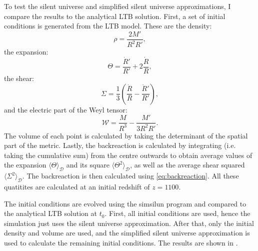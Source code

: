 To test the silent universe and simplified silent universe approximations, I compare the results to the analytical LTB solution.
First, a set of initial conditions is generated from the LTB model. These are the density:
\begin{equation}
    \rho = \frac{2M'}{R^2 R'},
\end{equation}
the expansion:
\begin{equation}
    \Theta = \frac{\dot{R}'}{R'} + 2\frac{\dot{R}}{R},
\end{equation}
the shear:
\begin{equation}
    \Sigma = \frac{1}{3}\left(\frac{\dot{R}}{R} - \frac{\dot{R}'}{R'}\right),
\end{equation}
and the electric part of the Weyl tensor:
\begin{equation}
    \mathcal{W} = \frac{M}{R^3}-\frac{M'}{3R^2R'}.
\end{equation}
The volume of each point is calculated by taking the determinant of the spatial part of the metric. Lastly, the backreaction is calculated by integrating (i.e. taking the cumulative sum) from the centre outwards to obtain average values of the expansion $\langle \Theta \rangle_\mathcal{D}$ and its square $\langle \Theta^2 \rangle_\mathcal{D}$, as well as the average shear squared $\langle \Sigma^2 \rangle_\mathcal{D}$. The backreaction is then calculated using \cref{eq:backreaction}. All these quatitites are calculated at an initial redshift of $z=1100$.

The initial conditions are evolved using the simsilun program and compared to the analytical LTB solution at $t_0$. First, all initial conditions are used, hence the simulation just uses the silent universe approximation. After that, only the initial density and volume are used, and the simplified silent universe approximation is used to calculate the remaining initial conditions. The results are shown in .

